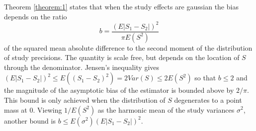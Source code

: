 \documentclass[12pt]{article}
\newcommand{\E}{E}
\renewcommand{\P}{P}
\newcommand{\V}{Var}
\newcommand{\biasratio}{b}%
\newcommand{\s}{S}
\newcommand{\x}{X}
\begin{document}

  
  Theorem \ref{theorem:1} states that when the study effects are gaussian the bias depends on the ratio
  $$
  \biasratio=\frac{(\E|\s_1-\s_2|)^2}{\pi\E(\s^2)}
  $$
  of the squared mean absolute difference to the second moment of the
  distribution of study precisions. The quantity is scale free, but depends on the location of $\s$ through the denominator. Jensen's inequality gives
  $(\E|\s_1-\s_2|)^2\le \E((\s_1-\s_2)^2)=2\V(S)\le 2E(\s^2)$ so that
  $\biasratio\le 2$ and the magnitude of the asymptotic bias of the
  estimator is bounded above by $2/\pi$. This bound is only
  achieved when the distribution of $S$ degenerates to a point mass at
  $0$. Viewing $1/E(\s^2)$ as the harmonic mean of the study variances
  $\sigma^2$, another bound is
  $\biasratio \le \E(\sigma^2)(\E|\s_1-\s_2|)^2$.  
\end{document}
